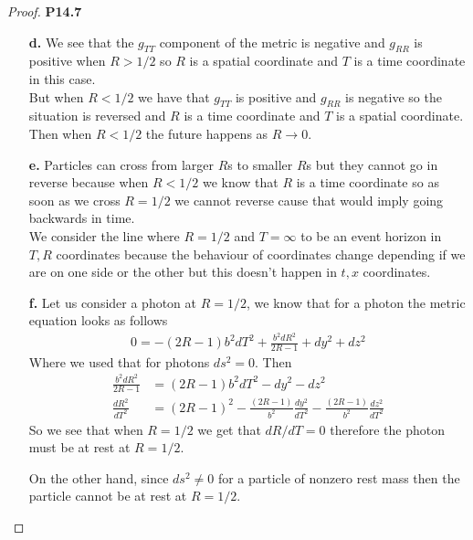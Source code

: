 \documentclass[11pt]{article}
\theoremstyle{definition}
\begin{document}
\begin{proof}{\textbf{P14.7}}
\begin{itemize}
\item [\textbf{d.}]
We see that the $g_{TT}$ component of the metric is negative and $g_{RR}$ is
positive when $R > 1/2$ so $R$ is a spatial coordinate and $T$ is a time
coordinate in this case.
\\
But when $R < 1/2$ we have that $g_{TT}$ is positive and $g_{RR}$ is negative
so the situation is reversed and $R$ is a time coordinate and $T$ is a spatial
coordinate. Then when $R < 1/2$ the future happens as $R \to 0$.

\item [\textbf{e.}]
Particles can cross from larger $R$s to smaller $R$s but they cannot go in
reverse because when $R < 1/2$ we know that $R$ is a time coordinate so as
soon as we cross $R = 1/2$ we cannot reverse cause that would imply going
backwards in time.
\\
We consider the line where $R = 1/2$ and $T = \infty$ to be an event horizon
in $T,R$ coordinates because the behaviour of coordinates change depending if
we are on one side or the other but this doesn't happen in $t,x$ coordinates.

\item [\textbf{f.}]
Let us consider a photon at $R = 1/2$, we know that for a photon the metric
equation looks as follows 
\begin{align*}
    0 = -(2R - 1)b^2 dT^2 + \frac{b^2 dR^2}{2R - 1} + dy^2 + dz^2
\end{align*}
Where we used that for photons $ds^2 = 0$. Then 
\begin{align*}
    \frac{b^2 dR^2}{2R - 1} &= (2R - 1)b^2 dT^2 - dy^2 - dz^2\\
    \frac{dR^2}{dT^2} &= (2R - 1)^2 - \frac{(2R - 1)}{b^2}\frac{dy^2}{dT^2}
    - \frac{(2R - 1)}{b^2}\frac{dz^2}{dT^2}
\end{align*}
So we see that when $R  = 1/2$ we get that $dR/dT = 0$ therefore the photon
must be at rest at $R = 1/2$.

On the other hand, since $ds^2 \neq 0$ for a particle of nonzero rest mass then
the particle cannot be at rest at $R = 1/2$.


\end{itemize}
\end{proof}
\end{document}
